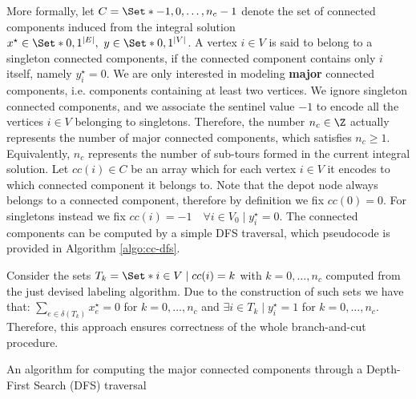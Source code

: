 More formally,
let $C = \Set*{-1, 0, \dots, n_c - 1}$ denote the set of connected components
induced from the integral solution $x^\star \in \Set*{0, 1}^{|E|},\ y \in \Set*{0, 1}^{|V|}$.
A vertex $i \in V$ is said to belong to a singleton connected components,
if the connected component contains only $i$ itself, namely $y^\star_i = 0$.
We are only interested in modeling \textbf{major} connected components,
i.e. components containing at least two vertices.
We ignore singleton connected components,
and we associate the sentinel value $-1$ to encode all the vertices $i \in V$ belonging to singletons.
Therefore, the number $n_c \in \Z$ actually represents the number
of major connected components, which satisfies $n_c \ge 1$.
Equivalently,
$n_c$ represents the number of sub-tours formed in the current integral solution.
Let $cc(i) \in C$ be an array
which for each vertex $i \in V$ it encodes to which connected component it belongs to.
Note that the depot node always belongs to a connected component,
therefore by definition we fix $cc(0) = 0$.
For singletons instead we fix $cc(i) = -1  \quad \forall i \in V_0 \mid y^\star_i = 0$.
The connected components can be computed
by a simple DFS traversal, which pseudocode is provided in Algorithm \ref{algo:cc-dfs}.

Consider the sets $T_k = \Set*{i \in V \mid cc(i) = k}$ with $k = 0, \dots, n_c$
computed from the just devised labeling algorithm.
Due to the construction of such sets we have that:
$\sum_{e \in \delta(T_k)} x^\star_e = 0$ for $k = 0, \dots, n_c$
and $\exists i \in T_k \mid y^\star_i = 1$ for $k = 0, \dots, n_c$.
Therefore, this approach ensures correctness of the whole branch-and-cut procedure.


\begin{algorithm}
	\caption{An algorithm for computing the major connected components through a Depth-First Search (DFS) traversal}
	
	\label{algo:cc-dfs}
\end{algorithm}


